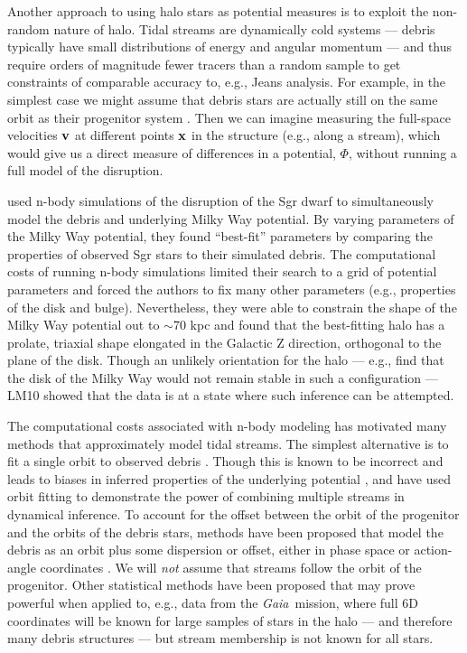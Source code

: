 \documentclass[letterpaper,12pt,preprint]{aastex}
\newcommand{\project}[1]{\textsl{#1}}
\newcommand{\gaia}{\project{Gaia}}
\begin{document}
Another approach to using halo stars as potential measures is to exploit the non-random nature of halo. Tidal streams are dynamically cold systems --- debris typically have small distributions of energy and angular momentum --- and thus require orders of magnitude fewer tracers than a random sample to get constraints of comparable accuracy to, e.g., Jeans analysis. For example, in the simplest case we might assume that debris stars are actually still on the same orbit as their progenitor system \citep[a \emph{wrong} assumption, see e.g.,][]{eyre11}. Then we can imagine measuring the full-space velocities ${\bf v}$ at different points ${\bf x}$ in the structure (e.g., along a stream), which would give us a direct measure of differences in a potential, $\Phi$, without running a full model of the disruption.

\citet[][LM10]{law10} used n-body simulations of the disruption of the Sgr dwarf to simultaneously model the debris and underlying Milky Way potential. By varying parameters of the Milky Way potential, they found ``best-fit'' parameters by comparing the properties of observed Sgr stars to their simulated debris. The computational costs of running n-body simulations limited their search to a grid of potential parameters and forced the authors to fix many other parameters (e.g., properties of the disk and bulge). Nevertheless, they were able to constrain the shape of the Milky Way potential out to $\sim$70 kpc and found that the best-fitting halo has a prolate, triaxial shape elongated in the Galactic Z direction, orthogonal to the plane of the disk. Though an unlikely orientation for the halo --- e.g., \cite{debattista13} find that the disk of the Milky Way would not remain stable in such a configuration --- LM10 showed that the data is at a state where such inference can be attempted. 

The computational costs associated with n-body modeling has motivated many methods that approximately model tidal streams. The simplest alternative is to fit a single orbit to observed debris \citep[e.g.,][]{koposov10, deg13}. Though this is known to be incorrect and leads to biases in inferred properties of the underlying potential \citep[e.g.,][]{eyre11, lux13, sanders13a}, \cite{deg14} and \cite{lux13} have used orbit fitting to demonstrate the power of combining multiple streams in dynamical inference. To account for the offset between the orbit of the progenitor and the orbits of the debris stars, methods have been proposed that model the debris as an orbit plus some dispersion or offset, either in phase space \citep[e.g.,][]{eyre09a, varghese11, kuepper12} or action-angle coordinates \citep{eyre11, sanders13b, bovy14, sanders14}. We will \emph{not} assume that streams follow the orbit of the progenitor. Other statistical methods have been proposed \citep[][]{penarrubia12, johnston99, sanderson14} that may prove powerful when applied to, e.g., data from the \gaia\, mission, where full 6D coordinates will be known for large samples of stars in the halo --- and therefore many debris structures --- but stream membership is not known for all stars.
\end{document}
